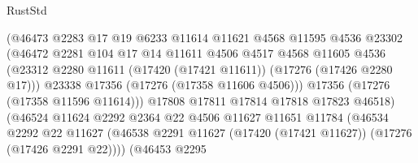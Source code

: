 \begin{lexlean}{RustStd}
\begin{coremodule}
                                  (@46473
                                    @2283
                                    @17
                                    @19
                                    @6233
                                    @11614
                                    @11621
                                    @4568
                                    @11595
                                    @4536
                                    @23302
                                    (@46472
                                      @2281
                                      @104
                                      @17
                                      @14
                                      @11611
                                      @4506
                                      @4517
                                      @4568
                                      @11605
                                      @4536
                                      (@23312
                                        @2280
                                        @11611
                                        (@17420 (@17421 @11611))
                                        (@17276 (@17426 @2280 @17)))
                                      @23338
                                      @17356
                                      (@17276 (@17358 @11606 @4506)))
                                    @17356
                                    (@17276 (@17358 @11596 @11614)))
                                  @17808
                                  @17811
                                  @17814
                                  @17818
                                  @17823
                                  @46518)
                                (@46524
                                  @11624
                                  @2292
                                  @2364
                                  @22
                                  @4506
                                  @11627
                                  @11651
                                  @11784
                                  (@46534
                                    @2292
                                    @22
                                    @11627
                                    (@46538
                                      @2291
                                      @11627
                                      (@17420 (@17421 @11627))
                                      (@17276 (@17426 @2291 @22))))
                                  (@46453
                                    @2295

\end{coremodule}
\end{lexlean}
